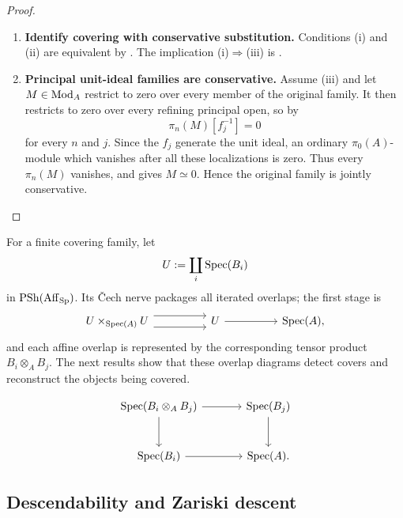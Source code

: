 \begin{proof}
\leavevmode
\begin{enumerate}[label=\textup{(\arabic*)}]
    \item \textbf{Identify covering with conservative substitution.}
    Conditions \textup{(i)} and \textup{(ii)} are equivalent by
    . The implication
    \textup{(i)}\(\Rightarrow\)\textup{(iii)} is
    .

    \item \textbf{Principal unit-ideal families are conservative.}
    Assume \textup{(iii)} and let \(M\in\operatorname{Mod}_A\) restrict to zero over every
    member of the original family. It then restricts to zero over every
    refining principal open, so by
    \[
        \pi_n(M)[f_j^{-1}]=0
    \]
    for every \(n\) and \(j\). Since the \(f_j\) generate the unit ideal,
    an ordinary \(\pi_0(A)\)-module which vanishes after all these
    localizations is zero. Thus every \(\pi_n(M)\) vanishes, and
     gives \(M\simeq0\).
    Hence the original family is jointly conservative.
\end{enumerate}
\end{proof}

For a finite covering family, let
\[
    U:=\coprod_i\operatorname{Spec}(B_i)
\]
in \(\operatorname{PSh}(\operatorname{Aff}_{\operatorname{Sp}})\). Its \v{C}ech nerve packages all iterated overlaps;
the first stage is
\[
\begin{tikzcd}[column sep=huge, row sep=large]
    U\times_{\Spec(A)}U
        \arrow[r, shift left=1.2ex]
        \arrow[r, shift right=1.2ex]
    &
    U
        \arrow[r]
    &
    \Spec(A),
\end{tikzcd}
\]
and each affine overlap is represented by the corresponding tensor product
\(B_i\otimes_AB_j\). The next results show that these overlap diagrams detect covers and
reconstruct the objects being covered.

\[
\begin{tikzcd}[column sep=large, row sep=large]
    \Spec(B_i\otimes_A B_j)
        \arrow[r]
        \arrow[d]
    &
    \Spec(B_j)
        \arrow[d]
    \\
    \Spec(B_i)
        \arrow[r]
    &
    \Spec(A).
\end{tikzcd}
\]


\subsection{Descendability and Zariski descent}


